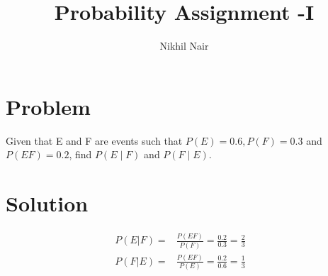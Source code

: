 \documentclass[journal,12pt,twocolumn]{IEEEtran}
\title{\mytitle}
\title{
Probability Assignment -I
}
\author{Nikhil Nair}
\begin{document}
\maketitle
\bigskip


\section{\textbf{Problem }}
Given that E and F are events such that $P(E)=0.6, P(F)=0.3$ and $P(E F)=0.2$, find $P(E \mid F)$ and $P(F \mid E)$.



\section{\textbf{Solution }}

\begin{align}
P(E|F)=&\frac{P(E  F)}{P(F)}=\frac{0.2}{0.3}=\frac{2}{3}&  
\\
P(F|E)=&\frac{P(E  F)}{P(E)}=\frac{0.2}{0.6}=\frac{1}{3}&  
\end{align}
\end{document}
